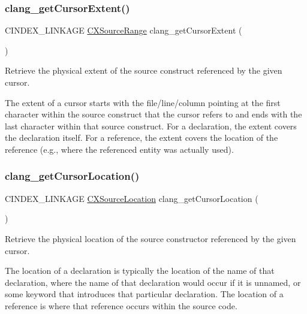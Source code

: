 \subsubsection{\texorpdfstring{clang\+\_\+get\+Cursor\+Extent()}{clang\_getCursorExtent()}}
{\footnotesize\ttfamily C\+I\+N\+D\+E\+X\+\_\+\+L\+I\+N\+K\+A\+GE \mbox{\hyperlink{structCXSourceRange}{C\+X\+Source\+Range}} clang\+\_\+get\+Cursor\+Extent (\begin{DoxyParamCaption}\item[{\mbox{\hyperlink{structCXCursor}{C\+X\+Cursor}}}]{ }\end{DoxyParamCaption})}



Retrieve the physical extent of the source construct referenced by the given cursor. 

The extent of a cursor starts with the file/line/column pointing at the first character within the source construct that the cursor refers to and ends with the last character within that source construct. For a declaration, the extent covers the declaration itself. For a reference, the extent covers the location of the reference (e.\+g., where the referenced entity was actually used). \mbox{\label{group__CINDEX__CURSOR__SOURCE_gada3d3cbd3a3e83ff64f992617318dfb1}} 
\subsubsection{\texorpdfstring{clang\+\_\+get\+Cursor\+Location()}{clang\_getCursorLocation()}}
{\footnotesize\ttfamily C\+I\+N\+D\+E\+X\+\_\+\+L\+I\+N\+K\+A\+GE \mbox{\hyperlink{structCXSourceLocation}{C\+X\+Source\+Location}} clang\+\_\+get\+Cursor\+Location (\begin{DoxyParamCaption}\item[{\mbox{\hyperlink{structCXCursor}{C\+X\+Cursor}}}]{ }\end{DoxyParamCaption})}



Retrieve the physical location of the source constructor referenced by the given cursor. 

The location of a declaration is typically the location of the name of that declaration, where the name of that declaration would occur if it is unnamed, or some keyword that introduces that particular declaration. The location of a reference is where that reference occurs within the source code. 